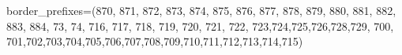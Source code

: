 \documentclass[
  letterpaper,
  DIV=11,
  numbers=noendperiod]{scrartcl}
\newenvironment{Shaded}{\begin{snugshade}}{\end{snugshade}}
\newcommand{\NormalTok}[1]{\textcolor[rgb]{0.00,0.23,0.31}{#1}}
\newcommand{\OperatorTok}[1]{\textcolor[rgb]{0.37,0.37,0.37}{#1}}
\newcommand{\StringTok}[1]{\textcolor[rgb]{0.13,0.47,0.30}{#1}}
\begin{document}
\begin{Shaded}
\begin{Highlighting}[]
\NormalTok{border\_prefixes}\OperatorTok{=}\NormalTok{(}\StringTok{\textquotesingle{}870\textquotesingle{}}\NormalTok{, }\StringTok{\textquotesingle{}871\textquotesingle{}}\NormalTok{, }\StringTok{\textquotesingle{}872\textquotesingle{}}\NormalTok{, }\StringTok{\textquotesingle{}873\textquotesingle{}}\NormalTok{, }\StringTok{\textquotesingle{}874\textquotesingle{}}\NormalTok{, }\StringTok{\textquotesingle{}875\textquotesingle{}}\NormalTok{, }\StringTok{\textquotesingle{}876\textquotesingle{}}\NormalTok{, }\StringTok{\textquotesingle{}877\textquotesingle{}}\NormalTok{, }\StringTok{\textquotesingle{}878\textquotesingle{}}\NormalTok{, }\StringTok{\textquotesingle{}879\textquotesingle{}}\NormalTok{, }\StringTok{\textquotesingle{}880\textquotesingle{}}\NormalTok{, }\StringTok{\textquotesingle{}881\textquotesingle{}}\NormalTok{, }\StringTok{\textquotesingle{}882\textquotesingle{}}\NormalTok{, }\StringTok{\textquotesingle{}883\textquotesingle{}}\NormalTok{, }\StringTok{\textquotesingle{}884\textquotesingle{}}\NormalTok{, }\StringTok{\textquotesingle{}73\textquotesingle{}}\NormalTok{, }\StringTok{\textquotesingle{}74\textquotesingle{}}\NormalTok{, }\StringTok{\textquotesingle{}716\textquotesingle{}}\NormalTok{, }\StringTok{\textquotesingle{}717\textquotesingle{}}\NormalTok{, }\StringTok{\textquotesingle{}718\textquotesingle{}}\NormalTok{, }\StringTok{\textquotesingle{}719\textquotesingle{}}\NormalTok{, }\StringTok{\textquotesingle{}720\textquotesingle{}}\NormalTok{, }\StringTok{\textquotesingle{}721\textquotesingle{}}\NormalTok{, }\StringTok{\textquotesingle{}722\textquotesingle{}}\NormalTok{, }\StringTok{\textquotesingle{}723\textquotesingle{}}\NormalTok{,}\StringTok{\textquotesingle{}724\textquotesingle{}}\NormalTok{,}\StringTok{\textquotesingle{}725\textquotesingle{}}\NormalTok{,}\StringTok{\textquotesingle{}726\textquotesingle{}}\NormalTok{,}\StringTok{\textquotesingle{}728\textquotesingle{}}\NormalTok{,}\StringTok{\textquotesingle{}729\textquotesingle{}}\NormalTok{, }\StringTok{\textquotesingle{}700\textquotesingle{}}\NormalTok{, }\StringTok{\textquotesingle{}701\textquotesingle{}}\NormalTok{,}\StringTok{\textquotesingle{}702\textquotesingle{}}\NormalTok{,}\StringTok{\textquotesingle{}703\textquotesingle{}}\NormalTok{,}\StringTok{\textquotesingle{}704\textquotesingle{}}\NormalTok{,}\StringTok{\textquotesingle{}705\textquotesingle{}}\NormalTok{,}\StringTok{\textquotesingle{}706\textquotesingle{}}\NormalTok{,}\StringTok{\textquotesingle{}707\textquotesingle{}}\NormalTok{,}\StringTok{\textquotesingle{}708\textquotesingle{}}\NormalTok{,}\StringTok{\textquotesingle{}709\textquotesingle{}}\NormalTok{,}\StringTok{\textquotesingle{}710\textquotesingle{}}\NormalTok{,}\StringTok{\textquotesingle{}711\textquotesingle{}}\NormalTok{,}\StringTok{\textquotesingle{}712\textquotesingle{}}\NormalTok{,}\StringTok{\textquotesingle{}713\textquotesingle{}}\NormalTok{,}\StringTok{\textquotesingle{}714\textquotesingle{}}\NormalTok{,}\StringTok{\textquotesingle{}715\textquotesingle{}}\NormalTok{)}

\end{Highlighting}
\end{Shaded}
\end{document}

